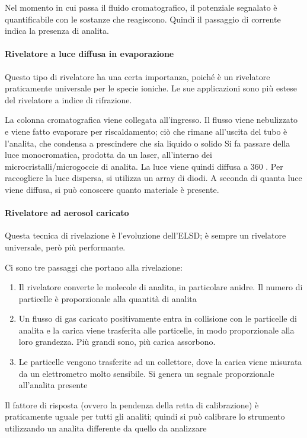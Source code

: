 
Nel momento in cui passa il fluido cromatografico, il potenziale segnalato è quantificabile con le sostanze che reagiscono. Quindi il passaggio di corrente indica la presenza di analita.

\paragraph{Rivelatore a luce diffusa in evaporazione}
Questo tipo di rivelatore ha una certa importanza, poiché è un rivelatore praticamente universale per le specie ioniche.
Le sue applicazioni sono più estese del rivelatore a indice di rifrazione.


La colonna cromatografica viene collegata all'ingresso. Il flusso viene nebulizzato e viene fatto evaporare per riscaldamento; ciò che rimane all'uscita del tubo è l'analita, che condensa a prescindere che sia liquido o solido
Si fa passare della luce monocromatica, prodotta da un laser, all'interno dei microcristalli/microgoccie di analita. La luce viene quindi diffusa a 360 \degree.
Per raccogliere la luce dispersa, si utilizza un array di diodi. A seconda di quanta luce viene diffusa, si può conoscere quanto materiale è presente.

\paragraph{Rivelatore ad aerosol caricato}
Questa tecnica di rivelazione è l'evoluzione dell'ELSD; è sempre un rivelatore universale, però più performante.


Ci sono tre passaggi che portano alla rivelazione:
\begin{enumerate}
\item Il rivelatore converte le molecole di analita, in particolare anidre. Il numero di particelle è proporzionale alla quantità di analita
\item Un flusso di gas caricato positivamente entra in collisione con le particelle di analita e la carica viene trasferita alle particelle,
in modo proporzionale alla loro grandezza. Più grandi sono, più carica assorbono.
\item Le particelle vengono trasferite ad un collettore, dove la carica viene misurata da un elettrometro molto sensibile. Si genera un segnale proporzionale all'analita presente
\end{enumerate}

Il fattore di risposta (ovvero la pendenza della retta di calibrazione) è praticamente uguale per tutti gli analiti; quindi si può calibrare lo strumento utilizzando un analita differente da quello da analizzare


